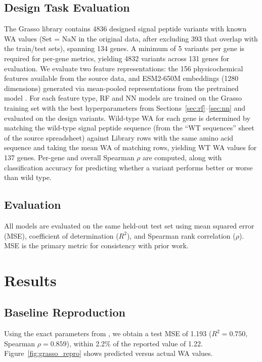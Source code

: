 \documentclass[12pt]{article}
\begin{document}
\subsection{Design Task Evaluation}
\label{sec:design_methods}

The Grasso library contains 4836 designed signal peptide variants with known WA values (Set = NaN in the original data, after excluding 393 that overlap with the train/test sets), spanning 134 genes.
A minimum of 5 variants per gene is required for per-gene metrics, yielding 4832 variants across 131 genes for evaluation.
We evaluate two feature representations: the 156 physicochemical features available from the source data, and ESM2-650M embeddings (1280 dimensions) generated via mean-pooled representations from the pretrained model \citep{lin2023}.
For each feature type, RF and NN models are trained on the Grasso training set with the best hyperparameters from Sections~\ref{sec:rf}--\ref{sec:nn} and evaluated on the design variants.
Wild-type WA for each gene is determined by matching the wild-type signal peptide sequence (from the ``WT sequences'' sheet of the source spreadsheet) against Library rows with the same amino acid sequence and taking the mean WA of matching rows, yielding WT WA values for 137 genes.
Per-gene and overall Spearman $\rho$ are computed, along with classification accuracy for predicting whether a variant performs better or worse than wild type.

\subsection{Evaluation}
\label{sec:metrics}

All models are evaluated on the same held-out test set using mean squared error (MSE), coefficient of determination ($R^2$), and Spearman rank correlation ($\rho$).
MSE is the primary metric for consistency with prior work.

\section{Results}
\label{sec:results}

\subsection{Baseline Reproduction}

Using the exact parameters from \citet{grasso2023}, we obtain a test MSE of 1.193 ($R^2 = 0.750$, Spearman $\rho = 0.859$), within 2.2\% of the reported value of 1.22.
Figure~\ref{fig:grasso_repro} shows predicted versus actual WA values.
\end{document}
